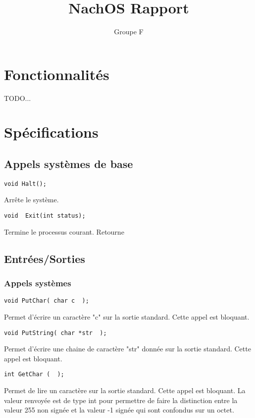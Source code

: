 \documentclass{report}
\title{NachOS Rapport}
\author{Groupe F}
\begin{document}
\maketitle

\tableofcontents

\chapter{Fonctionnalités}

TODO...

\chapter{Spécifications}

\section{Appels systèmes de base}

\begin{verbatim}
void Halt();
\end{verbatim}
Arrête le système.

\begin{verbatim}
void  Exit(int status);
\end{verbatim}
Termine le processus courant. Retourne 
\section{Entrées/Sorties}

\subsection{Appels systèmes}

\begin{verbatim}
void PutChar( char c  );
\end{verbatim}
Permet d'écrire un caractère "c" sur la sortie standard. Cette appel est bloquant.

\begin{verbatim}
void PutString( char *str  );
\end{verbatim}
Permet d'écrire une chaine de caractère "str" donnée  sur la sortie standard. Cette appel est bloquant.

\begin{verbatim}
int GetChar (  );
\end{verbatim}
Permet de lire un caractère sur la sortie standard. Cette appel est bloquant. La valeur renvoyée est de type int pour permettre de faire la distinction entre  la valeur 255 non signée et la valeur -1 signée qui sont confondus sur un octet.
\end{document}
